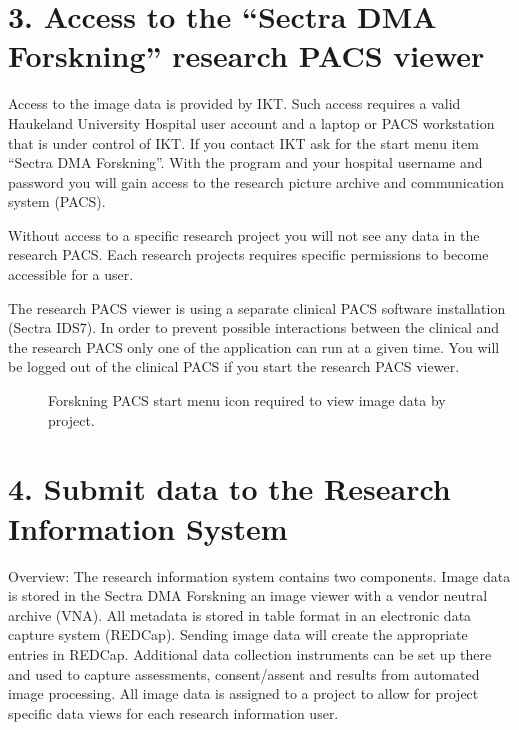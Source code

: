 \documentclass[letterpaper,10pt,english]{sphinxmanual}
\let\sphinxpxdimen\pdfpxdimen\else\newdimen\sphinxpxdimen
\begin{document}
\section{3. Access to the “Sectra DMA Forskning” research PACS viewer}
\label{\detokenize{EndUser/index:access-to-the-sectra-dma-forskning-research-pacs-viewer}}
\sphinxAtStartPar
Access to the image data is provided by IKT. Such access requires a valid Haukeland University Hospital user account and a laptop or PACS workstation that is under control of IKT. If you contact IKT ask for the start menu item “Sectra DMA Forskning”. With the program and your hospital username and password you will gain access to the research picture archive and communication system (PACS).

\sphinxAtStartPar
Without access to a specific research project you will not see any data in the research PACS. Each research projects requires specific permissions to become accessible for a user.

\sphinxAtStartPar
The research PACS viewer is using a separate clinical PACS software installation (Sectra IDS7). In order to prevent possible interactions between the clinical and the research PACS only one of the application can run at a given time. You will be logged out of the clinical PACS if you start the research PACS viewer.

\begin{figure}[htbp]
\centering
\capstart

\noindent\sphinxincludegraphics[width=268\sphinxpxdimen,height=451\sphinxpxdimen]{{ikt-sectra-dma-forskning}.png}
\caption{Forskning PACS start menu icon required to view image data by project.}\label{\detokenize{EndUser/index:id2}}\end{figure}


\section{4. Submit data to the Research Information System}
\label{\detokenize{EndUser/index:submit-data-to-the-research-information-system}}
\sphinxAtStartPar
Overview: The research information system contains two components. Image data is stored in the Sectra DMA Forskning \sphinxhyphen{} an image viewer with a vendor neutral archive (VNA). All meta\sphinxhyphen{}data is stored in table format in an electronic data capture system (REDCap). Sending image data will create the appropriate entries in REDCap. Additional data collection instruments can be set up there and used to capture assessments, consent/assent and results from automated image processing. All image data is assigned to a project to allow for project specific data views for each research information user.
\end{document}
